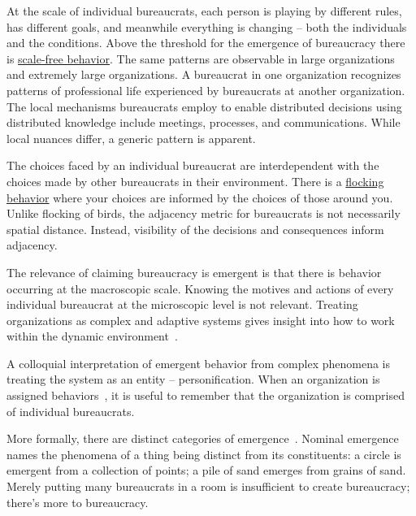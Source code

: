At the scale of individual bureaucrats, each person is playing by different rules, has different goals, and meanwhile everything is changing -- both the individuals and the conditions. 
Above the threshold for the emergence of bureaucracy there is \href{https://en.wikipedia.org/wiki/Scale_invariance}{scale-free behavior}. 
The same patterns are observable in large organizations and extremely large organizations. A bureaucrat in one organization recognizes patterns of professional life experienced by bureaucrats at another organization. The local mechanisms bureaucrats employ to enable distributed decisions using distributed knowledge include meetings, processes, and communications. While local nuances differ, a generic pattern is apparent. 

The choices faced by an individual bureaucrat are interdependent with the choices made by other bureaucrats in their environment. There is a \href{https://en.wikipedia.org/wiki/Flocking_(behavior)}{flocking behavior} 
\iftoggle{WPinmargin}{\marginpar{$>$Wikipedia: flocking behavior}}{}
where your choices are informed by the choices of those around you. Unlike flocking of birds, the adjacency metric for bureaucrats is not necessarily spatial distance. Instead, visibility of the decisions and consequences inform adjacency.


The relevance of claiming bureaucracy is emergent is that there is behavior occurring at the macroscopic scale. Knowing the motives and actions of every individual bureaucrat at the microscopic level is not relevant. Treating organizations as complex and adaptive systems gives insight into how to work within the dynamic environment~\cite{2011_Eisenhardt}.


A colloquial interpretation of emergent behavior from complex phenomena is treating the system as an entity -- personification.
When an organization is assigned behaviors~\cite{2002_Gall}, it is useful to remember that the organization is comprised of individual bureaucrats. 


More formally, there are distinct categories of emergence~\cite{2002_Bedau, 2021_Carroll_168}. Nominal emergence names the phenomena of a thing being distinct from its constituents: a circle is emergent from a collection of points; a pile of sand emerges from grains of sand. Merely putting many bureaucrats in a room is insufficient to create bureaucracy; there's more to bureaucracy. 

